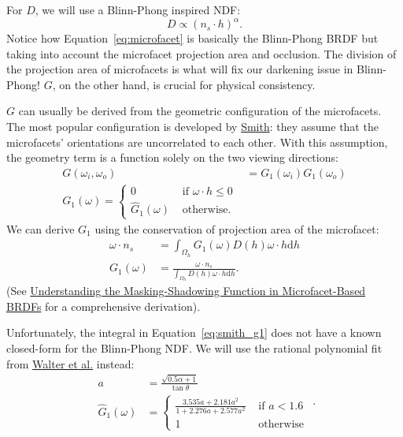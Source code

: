 For $D$, we will use a Blinn-Phong inspired NDF:
\begin{equation}
D \propto \left(n_s \cdot h\right)^{\alpha}.
\label{eq:blinn_NDF}
\end{equation}
Notice how Equation~\eqref{eq:microfacet} is basically the Blinn-Phong BRDF but taking into account the microfacet projection area and occlusion.
The division of the projection area of microfacets is what will fix our darkening issue in Blinn-Phong!
$G$, on the other hand, is crucial for physical consistency.

$G$ can usually be derived from the geometric configuration of the microfacets. The most popular configuration is developed by \href{https://ieeexplore.ieee.org/document/1138991}{Smith}: they assume that the microfacets' orientations are uncorrelated to each other. With this assumption, the geometry term is a function solely on the two viewing directions: 
\begin{equation}
\begin{aligned}
G(\omega_i, \omega_o) &= G_1(\omega_i) G_1(\omega_o) \\
G_1(\omega) = \begin{cases}
0 & \text{ if } \omega \cdot h \leq 0 \\
\hat{G}_1(\omega) & \text{ otherwise.}
\end{cases}
\end{aligned}
\end{equation}
We can derive $G_1$ using the conservation of projection area of the microfacet:
\begin{equation}
\begin{aligned}
\omega \cdot n_s &= \int_{\Omega_h} G_1(\omega) D(h) \omega \cdot h \mathrm{d} h \\
G_1(\omega) &= \frac{\omega \cdot n_s}{\int_{\Omega_h} D(h) \omega \cdot h \mathrm{d} h}. 
\label{eq:smith_g1}
\end{aligned}
\end{equation}
(See \href{https://jcgt.org/published/0003/02/03/}{Understanding the Masking-Shadowing Function in Microfacet-Based BRDFs} for a comprehensive derivation).

Unfortunately, the integral in Equation~\eqref{eq:smith_g1} does not have a known closed-form for the Blinn-Phong NDF. We will use the rational polynomial fit from \href{http://www.graphics.cornell.edu/~bjw/microfacetbsdf.pdf}{Walter et al.} instead:
\begin{equation}
\begin{aligned}
a &= \frac{\sqrt{0.5 \alpha + 1}}{\tan\theta} \\
\hat{G}_1(\omega) &= \begin{cases}
\frac{3.535a + 2.181a^2}{1 + 2.276a + 2.577a^2} & \text{ if } a < 1.6 \\
1 & \text{ otherwise}
\end{cases}
\end{aligned}.
\end{equation}

